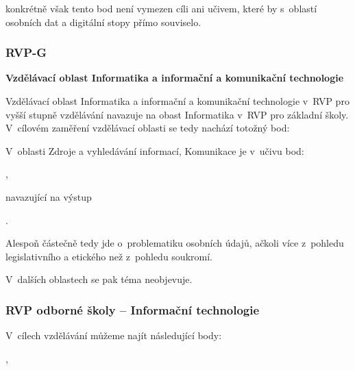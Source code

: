 konkrétně však tento bod není vymezen cíli ani učivem, které by s~oblastí osobních dat a digitální stopy přímo souviselo.

\subsubsection*{RVP-G}

\textbf{Vzdělávací oblast Informatika a informační a komunikační technologie}

Vzdělávací oblast Informatika a informační a komunikační technologie v~RVP pro vyšší stupně vzdělávání navazuje na obast Informatika v~RVP pro základní školy. V~cílovém zaměření vzdělávací oblasti se tedy nachází totožný bod:

\begin{displayquote}
	\citep{rvp-g}
\end{displayquote}

V~oblasti Zdroje a vyhledávání informací, Komunikace je v~učivu bod:

\begin{displayquote}
	\citep{rvp-g},
\end{displayquote}

navazující na výstup

\begin{displayquote}
	\citep{rvp-g}.
\end{displayquote}

Alespoň částečně tedy jde o~problematiku osobních údajů, ačkoli více z~pohledu legislativního a etického než z~pohledu soukromí.

V~dalších oblastech se pak téma neobjevuje. 

\subsubsection*{RVP odborné školy -- Informační technologie}

V~cílech vzdělávání můžeme najít následující body:

\begin{displayquote}
	\citep{rvp-it},
\end{displayquote}

